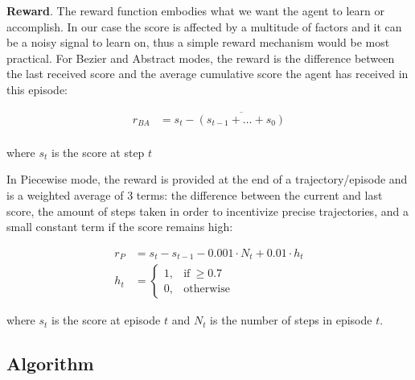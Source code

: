 \textbf{Reward}. The reward function embodies what we want the agent to learn or accomplish.
In our case the score is affected by a multitude of factors and it can be a noisy signal to learn on, thus a simple reward mechanism would be most practical.
For Bezier and Abstract modes, the reward is the difference between the last received score and the average cumulative score the agent has received in this episode:

\begin{equation}
\begin{aligned}
    r_{BA} &= s_t-\overline{(s_{t-1}+\dots+s_0)}\\
\end{aligned}
\label{eqn:reward}
\end{equation}

where $s_t$ is the score at step $t$

In Piecewise mode, the reward is provided at the end of a trajectory/episode and is a weighted average of 3 terms: the difference between the current and last score, the amount of steps taken in order to incentivize precise trajectories, and a small constant term if the score remains high:

\begin{equation}
\begin{aligned}
    r_P &= s_t-s_{t-1} - 0.001\cdot N_t + 0.01\cdot h_t\\
    h_t &=
    \begin{cases}
      1, & \text{if}\ \geq 0.7\\
      0, & \text{otherwise}
    \end{cases}
\end{aligned}
\label{eqn:rewre}
\end{equation}

where $s_t$ is the score at episode $t$ and $N_t$ is the number of steps in episode $t$.

\subsection{Algorithm}

